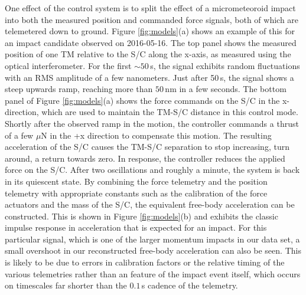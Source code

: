 \documentclass[preprint, trackchanges]{aastex61}
\begin{document}
One effect of the control system is to split the effect of a micrometeoroid impact into both the measured position and commanded force signals, both of which are telemetered down to ground. Figure \ref{fig:models}(a) shows an example of this for an impact candidate observed on 2016-05-16.  The top panel shows the measured position of one TM relative to the S/C along the x-axis, as measured using the optical interferometer.  For the first $\sim50\,$s, the signal exhibits random fluctuations with an RMS amplitude of a few nanometers. Just after 50$\,$s, the signal shows a steep upwards ramp, reaching more than $50\,$nm in a few seconds.  The bottom panel of Figure \ref{fig:models}(a) shows the force commands on the S/C in the x-direction, which are used to maintain the TM-S/C distance in this control mode. Shortly after the observed ramp in the motion, the controller commands a thrust of a few $\mu$N in the +x direction to compensate this motion.  The resulting acceleration of the S/C causes the TM-S/C separation to stop increasing, turn around, a return towards zero. In response, the controller reduces the applied force on the S/C. After two oscillations and roughly a minute, the system is back in its quiescent state.  By combining the force telemetry and the position telemetry with appropriate constants such as the calibration of the force actuators and the mass of the S/C, the equivalent free-body acceleration can be constructed. This is shown in Figure \ref{fig:models}(b) and exhibits the classic impulse response in acceleration that is expected for an impact. For this particular signal, which is one of the larger momentum impacts in our data set, a small overshoot in our reconstructed free-body acceleration can also be seen. This is likely to be due to errors in calibration factors or the relative timing of the various telemetries rather than an feature of the impact event itself, which occurs on timescales far shorter than the $0.1\,$s cadence of the telemetry. 
\end{document}
